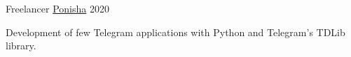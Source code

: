 \begin{cventries}
  \cventry
    {Freelancer} %
    {\href{https://ponisha.ir/profile/radinshayanfar}{Ponisha}} %
    {} %
    {2020} %
    {
      \begin{cvitems} %
        \item {Development of few Telegram applications with Python and Telegram's TDLib library.}
      \end{cvitems}
    }

\end{cventries}


